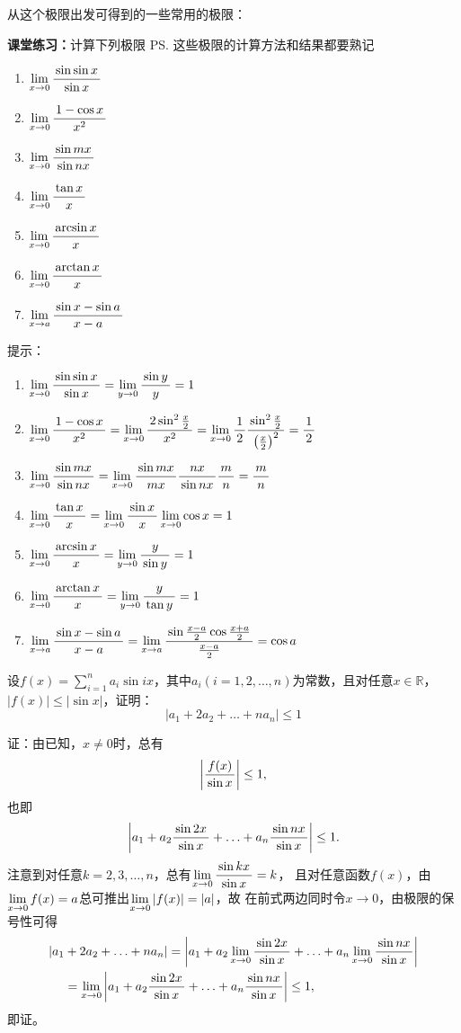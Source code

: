 \bs
从这个极限出发可得到的一些常用的极限：

{\bf 课堂练习：}计算下列极限
\ps{\baa 这些极限的计算方法和结果都要熟记}
\begin{enumerate}[(1)]
	  \setlength{\itemindent}{1cm}
  \item $\limx{0}\df{\sin\sin x}{\sin x}$ 
  \item $\limx 0\df{1-\cos x}{x^2}$ 
  \item $\limx 0\df{\sin mx}{\sin nx}$
  \item $\limx 0\df{\tan x}{x}$
  \item $\limx 0\df{\arcsin x}x$
  \item $\limx 0\df{\arctan x}x$
  \item $\limx a\df{\sin x-\sin a}{x-a}$
\end{enumerate}

\ifhint
提示：
\begin{enumerate}[(1)]
	\setlength{\itemindent}{1cm}
	\item $\limx{0}\df{\sin\sin x}{\sin x}
	=\lim\limits_{y\to0}\df{\sin y}y=1$ 
	\item $\limx 0\df{1-\cos x}{x^2}
	=\limx 0\df{2\sin^2\frac x2}{x^2}
	=\limx 0\df12\df{\sin^2\frac x2}
	{\left(\frac x2\right)^2}=\df12$ 
	\item $\limx 0\df{\sin mx}{\sin nx}
	=\limx 0\df{\sin mx}{mx}\df{nx}{\sin nx}\df mn=\df mn$
	\item $\limx 0\df{\tan x}{x}
	=\limx 0\df{\sin x}{x}\limx0\cos x=1$
	\item $\limx 0\df{\arcsin x}x
	=\lim\limits_{y\to0}\df{y}{\sin y}=1$
	\item $\limx 0\df{\arctan x}x
	=\lim\limits_{y\to0}\df{y}{\tan y}=1$
	\item $\limx a\df{\sin x-\sin a}{x-a}
	=\limx a\df{\sin\frac{x-a}2\cos\frac{x+a}2}{\frac{x-a}2}=\cos a$
\end{enumerate}
\fi

\bs

\egz 设$f(x)=\sum\limits_{i=1}^na_i\sin
ix$，其中$a_i(i=1,2,\ldots,n)$为常数，且对任意$x\in\mathbb{R}$， $|f(x)|\leq |\sin x|$，证明：
$$\left|a_1+2a_2+\ldots+na_n\right|\leq 1$$

证：由已知，$x\ne 0$时，总有
$$\left|\df{f(x)}{\sin x}\right|\leq 1,$$
也即
$$\left|a_1+a_2\df{\sin 2x}{\sin x}+\ldots
+a_n\df{\sin nx}{\sin x}\right|\leq 1.$$
注意到对任意$k=2,3,\ldots,n$，总有$\limx{0}\df{\sin kx}{\sin x}=k$，
且对任意函数$f(x)$，由$\limx{0}f(x)=a$总可推出$\limx{0}|f(x)|=|a|$，故
在前式两边同时令$x\to0$，由极限的保号性可得
\begin{align*}
	|a_1&+2a_2+\ldots+na_n|
	=\left|a_1+a_2\limx0\df{\sin 2x}{\sin x}+\ldots
	+a_n\limx0\df{\sin nx}{\sin x}\right|\\
	&=\limx0\left|a_1+a_2\df{\sin 2x}{\sin x}+\ldots
	+a_n\df{\sin nx}{\sin x}\right|\leq 1,
\end{align*}
即证。\fin

